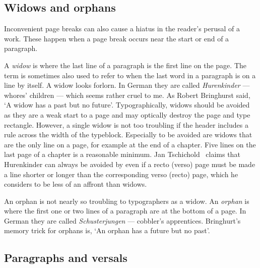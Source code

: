 \documentclass[10pt,a4paper,extrafontsizes]{memoir}
\begin{document}





\subsection{Widows and orphans}

\begin{paracol}{2}
\switchEng
    Inconvenient page breaks can also cause a hiatus in the reader's perusal
of a work. These happen when a page break occurs near the start or end of
a paragraph. 

    A \emph{widow} is where the last line of a 
paragraph is the first line on the page. The term is 
sometimes also used to refer to when the last word in a 
paragraph is on a line by itself. A widow looks forlorn.
In German they are called \textit{Hurenkinder} --- 
whores' children --- which seems rather cruel to me.
As Robert Bringhurst said, `A widow has a past but no future'. 
Typographically, widows should be avoided as they are a weak start to a page 
and may optically destroy the page and type rectangle. However, a single widow
is not too troubling if the header includes a rule across the width of the 
typeblock. Especially to be 
avoided are widows that are the only line on a page, for example at the end 
of a chapter. Five lines on the last page of a 
chapter is a reasonable minimum. 
Jan Tschichold~\autocite{TSCHICHOLD91} claims that Hurenkinder can always 
be avoided by even if a recto (verso) page must be made a line shorter or
longer than the corresponding verso (recto) page, which he considers to be 
less of an affront than widows.

    An orphan is not nearly so troubling to typographers as a 
widow. An \emph{orphan} is where the first one or two lines of a 
paragraph are at the bottom of a page. In German they are 
called \textit{Schusterjungen} --- cobbler's apprentices.
Bringhurt's memory trick for orphans is, `An orphan has a future but no 
past'. 
\end{paracol}

\subsection{Paragraphs and versals} \label{sec:versal}
\end{document}
